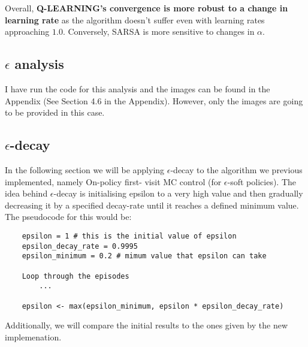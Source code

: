 \documentclass[11pt,a4paper]{article}
\begin{document}
Overall, \textbf{Q-LEARNING's convergence is more robust to a change in learning rate} as the algorithm doesn't suffer even with learning rates approaching $1.0$. Conversely, SARSA is more sensitive to changes in $\alpha$.

\vline

\subsection{$\epsilon$ analysis}

I have run the code for this analysis and the images can be found in the Appendix (See Section 4.6 in the Appendix). However, only the images are going to be provided in this case.

\vline

\subsection{$\epsilon$-decay}

In the following section we will be applying $\epsilon$-decay to the algorithm we previous implemented, namely On-policy first-
visit MC control (for $\epsilon$-soft policies). The idea behind $\epsilon$-decay is initialising epsilon to a very high value and then gradually decreasing it by a specified decay-rate until it reaches a defined minimum value. The pseudocode for this would be:

\begin{lstlisting}
    epsilon = 1 # this is the initial value of epsilon
    epsilon_decay_rate = 0.9995
    epsilon_minimum = 0.2 # mimum value that epsilon can take

    Loop through the episodes
        ...

    epsilon <- max(epsilon_minimum, epsilon * epsilon_decay_rate)
\end{lstlisting}

\vline

Additionally, we will compare the initial results to the ones given by the new implemenation. \\
\end{document}
